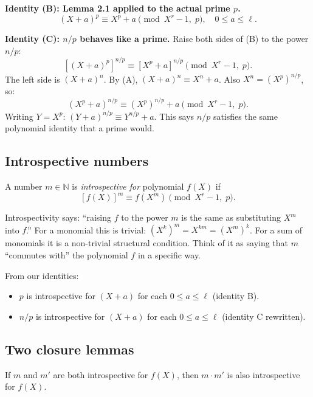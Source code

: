 \documentclass[12pt]{article}
\newcommand{\N}{\mathbb{N}}
\begin{document}
\textbf{Identity (B): Lemma 2.1 applied to the actual prime $p$.}
\begin{equation}
  (X+a)^p \equiv X^p+a \pmod{X^r-1,\; p}, \quad 0\leq a\leq\ell. \tag{B}
\end{equation}

\textbf{Identity (C): $n/p$ behaves like a prime.} Raise both sides of (B) to the power $n/p$:
\[
  [(X+a)^p]^{n/p} \equiv [X^p+a]^{n/p} \pmod{X^r-1,\;p}.
\]
The left side is $(X+a)^n$. By (A), $(X+a)^n\equiv X^n+a$. Also $X^n=(X^p)^{n/p}$, so:
\begin{equation}
  (X^p+a)^{n/p} \equiv (X^p)^{n/p}+a \pmod{X^r-1,\;p}. \tag{C}
\end{equation}
Writing $Y=X^p$: $(Y+a)^{n/p}\equiv Y^{n/p}+a$. This says $n/p$ satisfies the same polynomial identity that a prime would.

\subsection{Introspective numbers}

\begin{defbox}
A number $m\in\N$ is \emph{introspective for} polynomial $f(X)$ if
\[
  [f(X)]^m \equiv f(X^m) \pmod{X^r-1,\; p}.
\]
\end{defbox}

\begin{intubox}[Intuition]
Introspectivity says: ``raising $f$ to the power $m$ is the same as substituting $X^m$ into $f$.'' For a monomial this is trivial: $(X^k)^m = X^{km} = (X^m)^k$. For a sum of monomials it is a non-trivial structural condition. Think of it as saying that $m$ ``commutes with'' the polynomial $f$ in a specific way.
\end{intubox}

From our identities:
\begin{itemize}
  \item $p$ is introspective for $(X+a)$ for each $0\leq a\leq\ell$ \quad (identity B).
  \item $n/p$ is introspective for $(X+a)$ for each $0\leq a\leq\ell$ \quad (identity C rewritten).
\end{itemize}

\subsection{Two closure lemmas}

\begin{thmbox}
If $m$ and $m'$ are both introspective for $f(X)$, then $m\cdot m'$ is also introspective for $f(X)$.
\end{thmbox}
\end{document}
